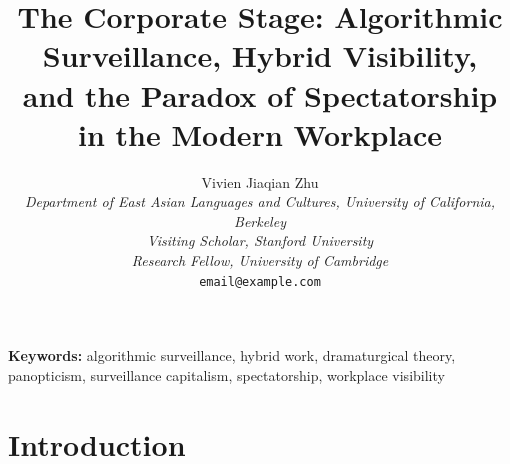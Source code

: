 \documentclass[11pt]{article}
\begin{document}
\title{The Corporate Stage: Algorithmic Surveillance, Hybrid Visibility, \\
and the Paradox of Spectatorship in the Modern Workplace}

\author{
  Vivien Jiaqian Zhu \\
  \textit{Department of East Asian Languages and Cultures, University of California, Berkeley} \\
  \textit{Visiting Scholar, Stanford University} \\
  \textit{Research Fellow, University of Cambridge} \\
  \texttt{email@example.com}
}

\date{}

\maketitle

\begin{abstract}
\end{abstract}

\textbf{Keywords:} algorithmic surveillance, hybrid work, dramaturgical
theory, panopticism, surveillance capitalism, spectatorship, workplace
visibility

\section{Introduction}
\label{sec:intro}

\end{document}

